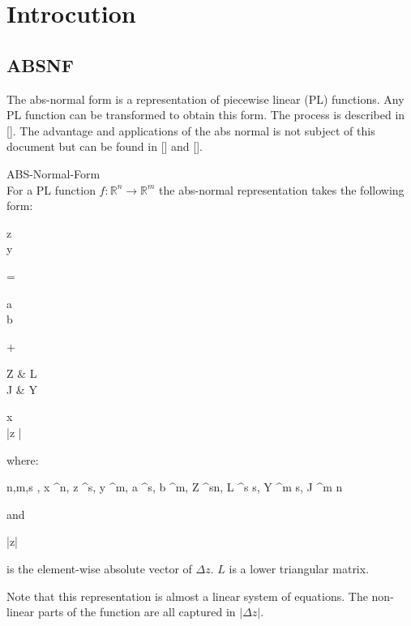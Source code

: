 \section{Introcution}
\subsection{ABSNF}
The abs-normal form is a representation of piecewise linear (PL) functions. Any PL function can be transformed to obtain  this form. The process is described in []. The advantage and applications of the abs normal is not subject of this document but can be found in [] and [].

\begin{mydef*}
	ABS-Normal-Form \\
	For a PL function $f:\mathbb{R}^n \rightarrow \mathbb{R}^m$ the abs-normal representation takes the following form:
	\begin{flalign} \label{absnf}
	\begin{pmatrix}
	\Delta z \\
	\Delta y
	\end{pmatrix}
	= 
	\begin{pmatrix}
	a \\
	b
	\end{pmatrix}
	+
	\begin{pmatrix}
	Z & L \\
	J & Y 
	\end{pmatrix}
	\times
	\begin{pmatrix}
	\Delta x \\
	|\Delta z |
	\end{pmatrix}
	\end{flalign}
	where:
	\begin{flalign*}
		n,m,s \in {}, \Delta x \in {}^n, \Delta z \in {}^s, \Delta y \in {}^m, a \in {}^s, b \in {}^{m}, Z \in {}^{s\times n}, L \in {}^{s \times s}, Y \in {}^{m \times s}, J \in {}^{m \times n}
	\end{flalign*}
	and 
	\begin{flalign*}
		|\Delta z|
	\end{flalign*}
	is the element-wise absolute vector of $\Delta z$. $L$ is a lower triangular matrix.
\end{mydef*}
Note that this representation is almost a linear system of equations. The non-linear parts of the function are all captured in $|\Delta z|$.

